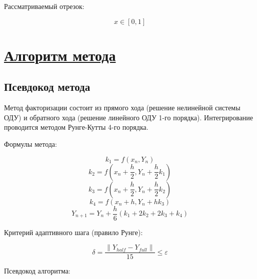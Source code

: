 \documentclass[14pt]{extarticle}
\begin{document}
	Рассматриваемый отрезок:
	
	\[
	x \in [0, 1]
	\]
	
	
	\newpage
	\section{\Large \underline{Алгоритм метода}}
	
	\subsection{Псевдокод метода}
	
	Метод факторизации состоит из прямого хода (решение нелинейной системы ОДУ)
	и обратного хода (решение линейного ОДУ 1-го порядка).
	Интегрирование проводится методом Рунге-Кутты 4-го порядка.
	
	Формулы метода:
	
	\[
	k_1 = f(x_n, Y_n)
	\]
	\[
	k_2 = f\left(x_n + \frac{h}{2}, Y_n + \frac{h}{2} k_1\right)
	\]
	\[
	k_3 = f\left(x_n + \frac{h}{2}, Y_n + \frac{h}{2} k_2\right)
	\]
	\[
	k_4 = f(x_n + h, Y_n + h k_3)
	\]
	\[
	Y_{n+1} = Y_n + \frac{h}{6}(k_1 + 2k_2 + 2k_3 + k_4)
	\]
	
	Критерий адаптивного шага (правило Рунге):
	
	\[
	\delta = \frac{\|Y_{half} - Y_{full}\|}{15} \le \varepsilon
	\]
	
	Псевдокод алгоритма:
	
\end{document}
